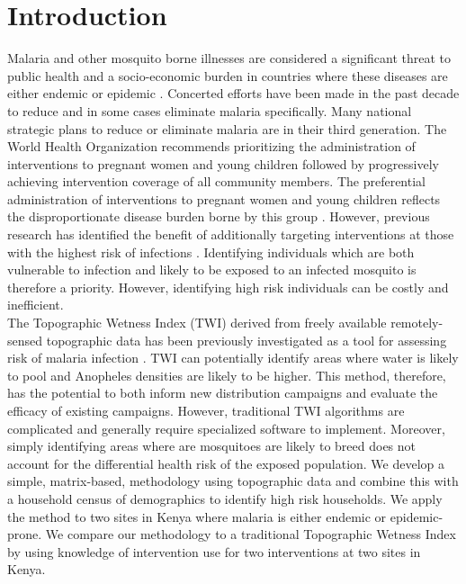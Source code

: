 \documentclass[10pt,letterpaper]{article}\usepackage[]{graphicx}\usepackage[]{color}
\begin{document}
\linenumbers

\section*{Introduction}
Malaria and other mosquito borne illnesses are considered a significant threat to public health and a socio-economic burden in countries where these diseases are either endemic or epidemic \cite{Crouch}. Concerted efforts have been made in the past decade to reduce and in some cases eliminate malaria specifically. Many national strategic plans to reduce or eliminate malaria are in their third generation.  The World Health Organization recommends prioritizing the administration of interventions to pregnant women and young children followed by progressively achieving intervention coverage of all community members. The preferential administration of interventions to pregnant women and young children reflects the disproportionate disease burden borne by this group \cite{Bousema2012}. However,  previous research has identified the benefit of additionally targeting interventions at those with the highest risk of infections \cite{Schantz-Dunn2009}. Identifying individuals which are both vulnerable to infection and likely to be exposed to an infected mosquito is therefore a priority.  However, identifying high risk individuals can be costly and inefficient.\\

The Topographic Wetness Index (TWI) \cite{Beven1979} derived from freely available remotely-sensed topographic data has been previously investigated as a tool for assessing risk of malaria infection \cite{Cohen2008,Cohen2010}. TWI can potentially identify areas where water is likely to pool and Anopheles densities are likely to be higher. This method, therefore, has the potential to both inform new distribution campaigns and evaluate the efficacy of existing campaigns.  However, traditional TWI algorithms are complicated and generally require specialized software to implement.  Moreover, simply identifying areas where are mosquitoes are likely to breed does not account for the differential health risk of the exposed population.  We develop a simple, matrix-based, methodology using topographic data and combine this with a household census of demographics to identify high risk households.  We apply the method to two sites in Kenya where malaria is either endemic or epidemic-prone.  We compare our methodology to a traditional Topographic  Wetness Index by using knowledge of intervention use for two interventions at two sites in Kenya. \\%
\end{document}
